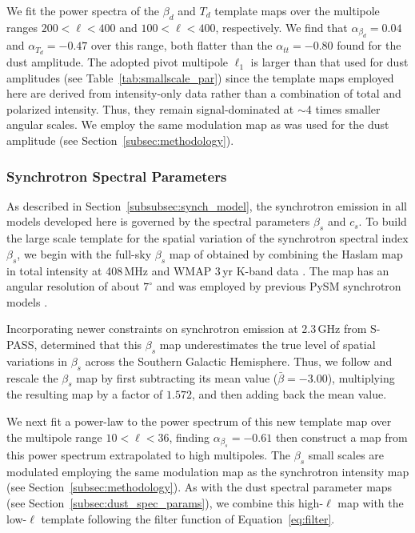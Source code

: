 \documentclass[twocolumn]{aastex631}
\begin{document}
We fit the power spectra of the $\beta_d$ and $T_d$ template maps over the multipole ranges $200 < \ell < 400$ and $100 < \ell < 400$, respectively. We find that $\alpha_{\beta_d}= 0.04$ and $\alpha_{T_d} = -0.47$ over this range, both flatter than the $\alpha_{tt} = -0.80$ found for the dust amplitude. The adopted pivot multipole $\ell_1$ is larger than that used for dust amplitudes (see Table~\ref{tab:smallscale_par}) since the template maps employed here are derived from intensity-only data rather than a combination of total and polarized intensity. Thus, they remain signal-dominated at $\sim$4 times smaller angular scales. We employ the same modulation map as was used for the dust amplitude (see Section~\ref{subsec:methodology}).

\subsubsection{Synchrotron Spectral Parameters}\label{sec:beta_s}
As described in Section~\ref{subsubsec:synch_model}, the synchrotron emission in all models developed here is governed by the spectral parameters $\beta_s$ and $c_s$. To build the large scale template for the spatial variation of the synchrotron spectral index $\beta_s$, we begin with the full-sky $\beta_s$ map of \citet{Miville-Deschenes:2008} obtained by combining the Haslam map in total intensity at 408\,MHz \citep{Remazeilles:2015} and WMAP 3\,yr K-band data \citep{Hinshaw:2007}. The map has an angular resolution of about $7^{\circ}$ and was employed by previous PySM synchrotron models \citep{Thorne:2017}.

Incorporating newer constraints on synchrotron emission at 2.3\,GHz from S-PASS, \citet{Krachmalnicoff:2018} determined that this $\beta_s$ map underestimates the true level of spatial variations in $\beta_s$ across the Southern Galactic Hemisphere. Thus, we follow \citet{Krachmalnicoff:2018} and rescale the $\beta_s$ map by first subtracting its mean value ($\bar{\beta} = -3.00$), multiplying the resulting map by a factor of $1.572$, and then adding back the mean value.

We next fit a power-law to the power spectrum of this new template map over the multipole range $10 < \ell < 36$, finding $\alpha_{\beta_s}=-0.61$ then construct a map from this power spectrum extrapolated to high multipoles. The $\beta_s$ small scales are modulated employing the same modulation map as the synchrotron intensity map (see Section~\ref{subsec:methodology}). As with the dust spectral parameter maps (see Section~\ref{subsec:dust_spec_params}), we combine this high-$\ell$ map with the low-$\ell$ template following the filter function of Equation~\ref{eq:filter}.
 
\end{document}

